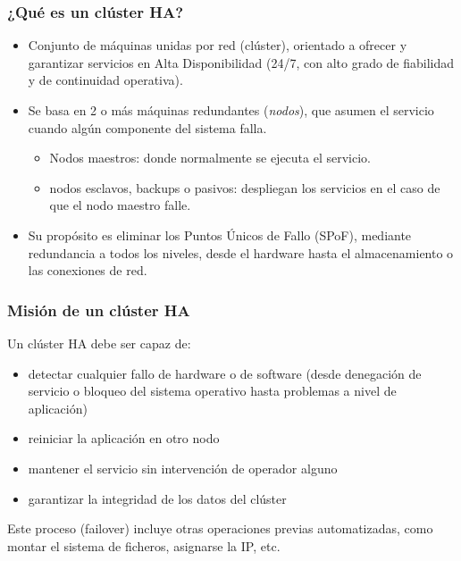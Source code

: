 \documentclass{beamer}
\begin{document}
\begin{frame}
\frametitle{¿Qué es un clúster HA?}


\begin{itemize}
\item \alert{Conjunto de máquinas unidas por red} (clúster), orientado a ofrecer y garantizar servicios en \alert{Alta Disponibilidad} (24/7, con alto grado de fiabilidad y de continuidad operativa).
\item Se basa en 2 o más máquinas redundantes (\textit{nodos}), que asumen el servicio cuando algún componente del sistema falla.

	\begin{itemize}
	\item \alert{Nodos maestros}: donde normalmente se ejecuta el servicio.
	\item \alert{nodos esclavos}, \alert{backups} o \alert{pasivos}: despliegan los servicios en el caso de que el nodo maestro falle. 
	\end{itemize}

\item Su propósito es eliminar los \alert{Puntos Únicos de Fallo} (SPoF), mediante redundancia a todos los niveles, desde el hardware hasta el almacenamiento o las conexiones de red. 

\end{itemize}

\end{frame}


\begin{frame}
\frametitle{Misión de un clúster HA}

Un clúster HA debe ser capaz de: 

\begin{itemize}
\item detectar cualquier fallo de hardware o de software (desde denegación de servicio o bloqueo del sistema operativo hasta problemas a nivel de aplicación)
\item reiniciar la aplicación en otro nodo
\item mantener el servicio sin intervención de operador alguno
\item garantizar la integridad de los datos del clúster
\end{itemize}

Este proceso (\alert{failover}) incluye otras operaciones previas automatizadas, como montar el sistema de ficheros, asignarse la IP, etc. 

\end{frame}
\end{document}
